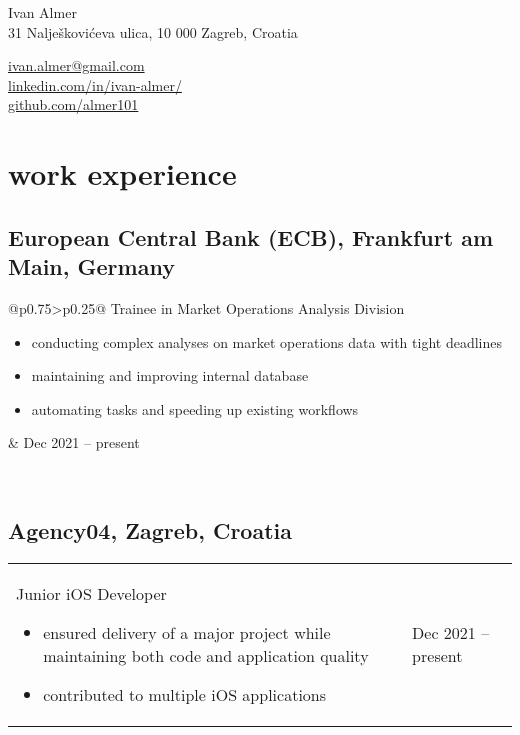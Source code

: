 \documentclass[a4paper]{article}
\makeatletter
\newlength{\tablewidth}
\newenvironment{period}[2]{%
\newcommand{\sarma}{#2}%
\setlength{\tablewidth}{\linewidth}
\addtolength{\tablewidth}{-2\tabcolsep}
\begin{tabular}{@{}p{0.75\tablewidth}>{\raggedleft\arraybackslash}p{0.25\tablewidth}@{}}%
#1 \newline
\begin{itemize}
}{%
\end{itemize} & \sarma \\%
\end{tabular}\\
}
\makeatother
\begin{document}
\fontfamily{\sfdefault}
\selectfont

\begin{minipage}{.5\textwidth}
\LARGE{Ivan Almer}\\
\normalsize{31 Nalješkovićeva ulica, 10 000 Zagreb, Croatia}
\end{minipage}%
\begin{minipage}{.5\textwidth}
\raggedleft
\href{mailto:ivan.almer@gmail.com}{ivan.almer@gmail.com} \\
\href{https://www.linkedin.com/in/ivan-almer/}{linkedin.com/in/ivan-almer/} \\
\href{https://github.com/almer101}{github.com/almer101} \\
\end{minipage}

\vspace{1em}

\section{work experience}
\subsection{European Central Bank (ECB), Frankfurt am Main, Germany}
\begin{period}{Trainee in Market Operations Analysis Division}{Dec 2021 -- present}
        \item 
            conducting complex analyses on market operations data with tight deadlines
        \item
            maintaining and improving internal database
        \item 
            automating tasks and speeding up existing workflows
\end{period}

\subsection{Agency04, Zagreb, Croatia}
\begin{period}{Junior iOS Developer}{Jul 2018 -- Feb 2021}
    \item
        ensured delivery of a major project while maintaining both code and application quality
    \item
        contributed to multiple iOS applications
\end{period}
\end{document}
